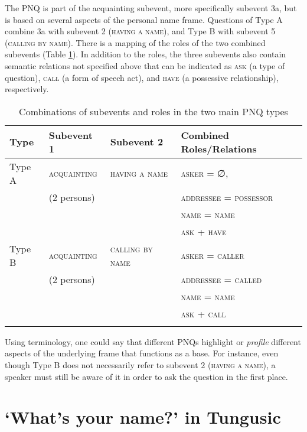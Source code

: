\documentclass[output=paper,colorlinks,citecolor=brown]{langscibook}
\begin{document}
The PNQ is part of the acquainting subevent, more specifically subevent 3a, but is based on several aspects of the personal name frame. Questions of Type A combine 3a with subevent 2 (\textsc{having a name}), and Type B with subevent 5 (\textsc{calling by name}). There is a mapping of the roles of the two combined subevents (Table \ref{table:4.5}). In addition to the roles, the three subevents also contain semantic relations not specified above that can be indicated as \textsc{ask} (a type of question), \textsc{call} (a form of speech act), and \textsc{have} (a possessive relationship), respectively.

\begin{table}
\begin{tabular}{ l l l l }
  \lsptoprule
Type    &	Subevent 1  &	Subevent 2      &	Combined Roles/Relations\\
  \midrule
Type A  &	\textsc{acquainting} &   \textsc{having a name}   &	\textsc{asker} = ∅,\\
        &   (2 persons)	&                   &   \textsc{addressee} = \textsc{possessor}\\
        &               &                   &   \textsc{name} = \textsc{name}\\
        &               &                   &   \textsc{ask} + \textsc{have}\\
Type B  &   \textsc{acquainting} &   \textsc{calling by name} &	\textsc{asker} = \textsc{caller}\\
        &   (2 persons) &                   &   \textsc{addressee} = \textsc{called}\\
        &               &                   &   \textsc{name} = \textsc{name}\\
        &               &                   &   \textsc{ask} + \textsc{call}\\
  \lspbottomrule
\end{tabular}
\caption{Combinations of subevents and roles in the two main PNQ types}
\label{table:4.5}
\end{table}

Using  terminology, one could say that different PNQs highlight or \textit{profile} different aspects of the underlying frame that functions as a base. For instance, even though Type B does not necessarily refer to subevent 2 (\textsc{having a name}), a speaker must still be aware of it in order to ask the question in the first place.


\section{‘What’s your name?’ in Tungusic}\label{section4.4}
\end{document}
